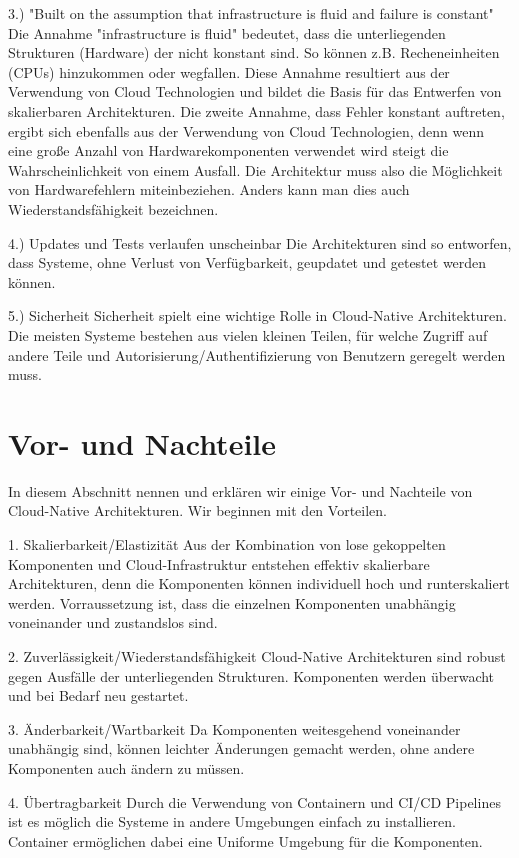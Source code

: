 3.) "Built on the assumption that infrastructure is fluid and failure is constant"
Die Annahme "infrastructure is fluid" bedeutet, dass die unterliegenden Strukturen (Hardware) der nicht konstant sind. So können z.B. Recheneinheiten (CPUs) hinzukommen oder wegfallen. Diese Annahme resultiert aus der Verwendung von Cloud Technologien und bildet die Basis für das Entwerfen von skalierbaren Architekturen.
Die zweite Annahme, dass Fehler konstant auftreten, ergibt sich ebenfalls aus der Verwendung von Cloud Technologien, denn wenn eine große Anzahl von Hardwarekomponenten verwendet wird steigt die Wahrscheinlichkeit von einem Ausfall. Die Architektur muss also die Möglichkeit von Hardwarefehlern miteinbeziehen. Anders kann man dies auch Wiederstandsfähigkeit bezeichnen.

4.) Updates und Tests verlaufen unscheinbar
Die Architekturen sind so entworfen, dass Systeme, ohne Verlust von Verfügbarkeit, geupdatet und getestet werden können.

5.) Sicherheit
Sicherheit spielt eine wichtige Rolle in Cloud-Native Architekturen. Die meisten Systeme bestehen  aus vielen kleinen Teilen, für welche Zugriff auf andere Teile und Autorisierung/Authentifizierung von Benutzern geregelt werden muss.

\section{Vor- und Nachteile}
In diesem Abschnitt nennen und erklären wir einige Vor- und Nachteile von Cloud-Native Architekturen. Wir beginnen mit den Vorteilen.

1. Skalierbarkeit/Elastizität
Aus der Kombination von lose gekoppelten Komponenten und Cloud-Infrastruktur entstehen effektiv skalierbare Architekturen, denn die Komponenten können individuell hoch und runterskaliert werden. Vorraussetzung ist, dass die einzelnen Komponenten unabhängig voneinander und zustandslos sind.

2. Zuverlässigkeit/Wiederstandsfähigkeit
Cloud-Native Architekturen sind robust gegen Ausfälle der unterliegenden Strukturen. Komponenten werden überwacht und bei Bedarf neu gestartet.

3. Änderbarkeit/Wartbarkeit
Da Komponenten weitesgehend voneinander unabhängig sind, können leichter Änderungen gemacht werden, ohne andere Komponenten auch ändern zu müssen.

4. Übertragbarkeit
Durch die Verwendung von Containern und CI/CD Pipelines ist es möglich die Systeme in andere Umgebungen einfach zu installieren. Container ermöglichen dabei eine Uniforme Umgebung für die Komponenten.

